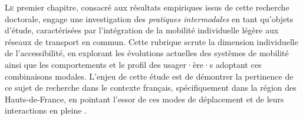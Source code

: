 \begin{refsegment}
\lettrine[lines=3, findent=8pt, nindent=0pt]{ L}{e} premier chapitre, consacré aux résultats empiriques issus de cette recherche doctorale, engage une investigation des \textsl{pratiques intermodales} en tant qu'objets d'étude, caractérisées par l'intégration de la mobilité individuelle légère aux réseaux de \gls{transport en commun}. Cette rubrique scrute la dimension individuelle de l'\gls{accessibilité}, en explorant les évolutions actuelles des systèmes de mobilité ainsi que les comportements et le profil des usager·ère·s adoptant ces combinaisons modales. L'enjeu de cette étude est de démontrer la pertinence de ce sujet de recherche dans le contexte français, spécifiquement dans la région des Hauts-de-France, en pointant l'essor de ces modes de déplacement et de leurs interactions \textcolor{blue}{\autocites[77]{oostendorp_combining_2018}[56]{ensor_mode_2021}} en pleine  \textcolor{blue}{\autocite[15]{amar_homo_2016}}.%


\end{refsegment}
